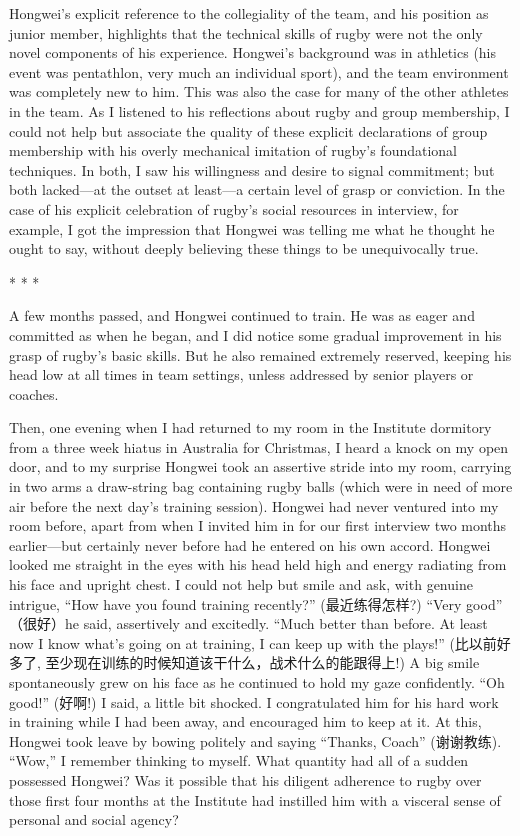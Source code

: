 \begin{CJK}{UTF8}{gbsn}
Hongwei's explicit reference to the collegiality of the team, and his position as junior member, highlights that the technical skills of rugby were not the only novel components of his experience.  Hongwei's background was in athletics (his event was pentathlon, very much an individual sport), and the team environment was completely new to him.  This was also the case for many of the other athletes in the team.  As I listened to his reflections about rugby and group membership, I could not help but associate the quality of these explicit declarations of group membership with his overly mechanical imitation of rugby's foundational techniques.  In both, I saw his willingness and desire to signal commitment; but both lacked---at the outset at least---a certain level of grasp or conviction.  In the case of his explicit celebration of rugby's social resources in interview, for example, I got the impression that Hongwei was telling me what he thought he ought to say, without deeply believing these things to be unequivocally true.


                            \begin{center}
                                * * *
                            \end{center}

A few months passed, and Hongwei continued to train.  He was as eager and committed as when he began, and I did notice some gradual improvement in his grasp of rugby's basic skills.  But he also remained extremely reserved, keeping his head low at all times in team settings, unless addressed by senior players or coaches.

Then, one evening when I had returned to my room in the Institute dormitory from a three week hiatus in Australia for Christmas, I heard a knock on my open door, and to my surprise Hongwei took an assertive stride into my room, carrying in two arms a draw-string bag containing rugby balls (which were in need of more air before the next day's training session).  Hongwei had never ventured into my room before, apart from when I invited him in for our first interview two months earlier---but certainly never before had he entered on his own accord.  Hongwei looked me straight in the eyes with his head held high and energy radiating from his face and upright chest.  I could not help but smile and ask, with genuine intrigue, ``How have you found training recently?'' (最近练得怎样?)
``Very good'' （很好）he said, assertively and excitedly.  ``Much better than before.  At least now I know what's going on at training, I can keep up with the plays!'' (比以前好多了, 至少现在训练的时候知道该干什么，战术什么的能跟得上!) A big smile spontaneously grew on his face as he continued to hold my gaze confidently.  ``Oh good!'' (好啊!) I said, a little bit shocked.  I congratulated him for his hard work in training while I had been away, and encouraged him to keep at it.  At this, Hongwei took leave by bowing politely and saying ``Thanks, Coach'' (谢谢教练).  ``Wow,'' I remember thinking to myself.  What quantity had all of a sudden possessed Hongwei? Was it possible that his diligent adherence to rugby over those first four months at the Institute had instilled him with a visceral sense of personal and social agency?


\end{CJK}
